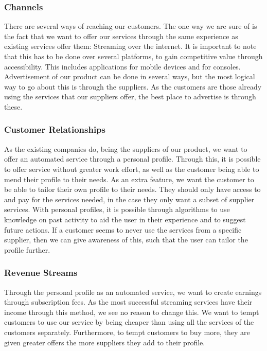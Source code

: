 \subsubsection*{Channels}
There are several ways of reaching our customers. The one way we are sure of is the fact that we want to offer our services through the same experience as existing services offer them: Streaming over the internet. It is important to note that this has to be done over several platforms, to gain competitive value through accessibility. This includes applications for mobile devices and for consoles. Advertisement of our product can be done in several ways, but the most logical way to go about this is through the suppliers. As the customers are those already using the services that our suppliers offer, the best place to advertise is through these.

\subsubsection*{Customer Relationships}
As the existing companies do, being the suppliers of our product, we want to offer an automated service through a personal profile. Through this, it is possible to offer service without greater work effort, as well as the customer being able to mend their profile to their needs. As an extra feature, we want the customer to be able to tailor their own profile to their needs. They should only have access to and pay for the services needed, in the case they only want a subset of supplier services. With personal profiles, it is possible through algorithms to use knowledge on past activity to aid the user in their experience and to suggest future actions. If a customer seems to never use the services from a specific supplier, then we can give awareness of this, such that the user can tailor the profile further.

\subsubsection*{Revenue Streams}
Through the personal profile as an automated service, we want to create earnings through subscription fees. As the most successful streaming services have their income through this method, we see no reason to change this. We want to tempt customers to use our service by being cheaper than using all the services of the customers separately. Furthermore, to tempt customers to buy more, they are given greater offers the more suppliers they add to their profile.

